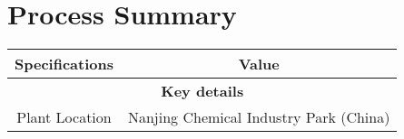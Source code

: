 \section{Process Summary}
\label{app:processsummary}


\begin{landscape}
\begin{table}[]
\centering
\begin{tabular}{@{}ccc@{}}
\toprule
\multicolumn{2}{c}{\textbf{Specifications}}                                                                           & \textbf{Value}                                                                                                                                                                                                                                                                                                                                                                                                                             \\ \midrule
\multicolumn{3}{|c|}{\textbf{Key details}}                                                                                                                                                                                                                                                                                                                                                                                                                                                                                                                         \\ \midrule
\multicolumn{2}{|c|}{Plant Location}                                                                                  & \multicolumn{1}{c|}{Nanjing Chemical Industry Park (China)}                                                                                                                                                                                                                                                                                                                                                                                \\ \midrule

\end{tabular}
\end{table}
\end{landscape}
